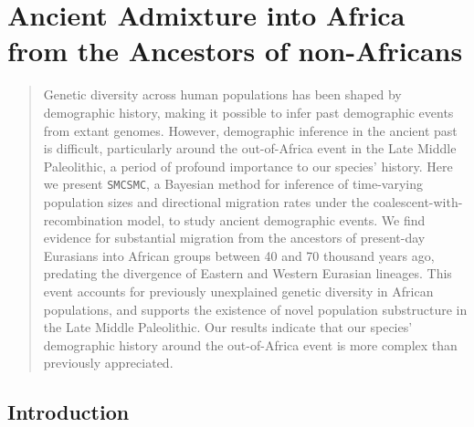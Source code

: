 

\chapter{\label{ch:1-aaa} Ancient Admixture into Africa from the Ancestors of non-Africans} 

\minitoc




\begin{quote}
    \noindent \small Genetic diversity across human populations has been shaped by demographic history, making it possible to infer past demographic events from extant genomes. However, demographic inference in the ancient past is difficult, particularly around the out-of-Africa event in the Late Middle Paleolithic, a period of profound importance to our species' history.  Here we present {\tt SMCSMC}, a Bayesian method for inference of time-varying population sizes and directional migration rates under the coalescent-with-recombination model, to study ancient demographic events. We find evidence for substantial migration from the ancestors of present-day Eurasians into African groups between 40 and 70 thousand years ago, predating the divergence of Eastern and Western Eurasian lineages.  This event accounts for previously unexplained genetic diversity in African populations, and supports the existence of novel population substructure in the Late Middle Paleolithic. Our results indicate that our species' demographic history around the out-of-Africa event is more complex than previously appreciated.
\end{quote}

\newpage

\printglossary

\section{Introduction}

